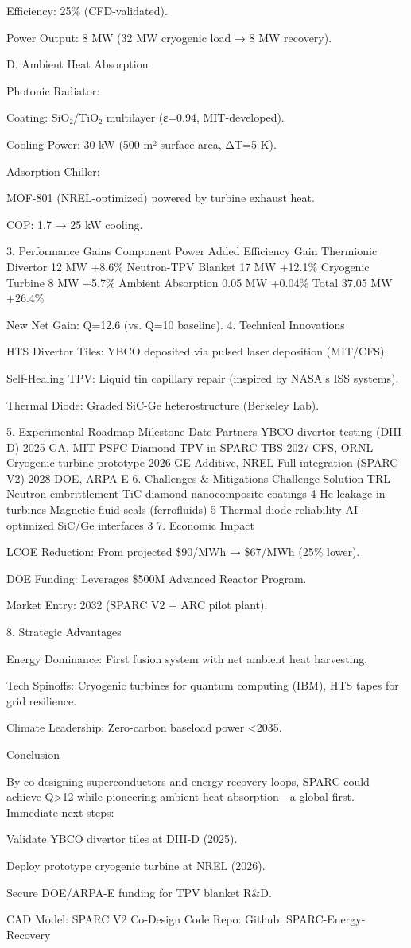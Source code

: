 \documentclass{article}
\begin{document}
Efficiency: 25\% (CFD-validated).

Power Output: 8 MW (32 MW cryogenic load → 8 MW recovery).

D. Ambient Heat Absorption

Photonic Radiator:

Coating: SiO₂/TiO₂ multilayer (ε=0.94, MIT-developed).

Cooling Power: 30 kW (500 m² surface area, ΔT=5 K).

Adsorption Chiller:

MOF-801 (NREL-optimized) powered by turbine exhaust heat.

COP: 1.7 → 25 kW cooling.

3. Performance Gains Component Power Added Efficiency Gain Thermionic
Divertor 12 MW +8.6\% Neutron-TPV Blanket 17 MW +12.1\% Cryogenic
Turbine 8 MW +5.7\% Ambient Absorption 0.05 MW +0.04\% Total 37.05 MW
+26.4\%

New Net Gain: Q=12.6 (vs. Q=10 baseline). 4. Technical Innovations

HTS Divertor Tiles: YBCO deposited via pulsed laser deposition
(MIT/CFS).

Self-Healing TPV: Liquid tin capillary repair (inspired by NASA's ISS
systems).

Thermal Diode: Graded SiC-Ge heterostructure (Berkeley Lab).

5. Experimental Roadmap Milestone Date Partners YBCO divertor testing
(DIII-D) 2025 GA, MIT PSFC Diamond-TPV in SPARC TBS 2027 CFS, ORNL
Cryogenic turbine prototype 2026 GE Additive, NREL Full integration
(SPARC V2) 2028 DOE, ARPA-E 6. Challenges \& Mitigations Challenge
Solution TRL Neutron embrittlement TiC-diamond nanocomposite coatings 4
He leakage in turbines Magnetic fluid seals (ferrofluids) 5 Thermal
diode reliability AI-optimized SiC/Ge interfaces 3 7. Economic Impact

LCOE Reduction: From projected \$90/MWh → \$67/MWh (25\% lower).

DOE Funding: Leverages \$500M Advanced Reactor Program.

Market Entry: 2032 (SPARC V2 + ARC pilot plant).

8. Strategic Advantages

Energy Dominance: First fusion system with net ambient heat harvesting.

Tech Spinoffs: Cryogenic turbines for quantum computing (IBM), HTS tapes
for grid resilience.

Climate Leadership: Zero-carbon baseload power \textless2035.

Conclusion

By co-designing superconductors and energy recovery loops, SPARC could
achieve Q\textgreater12 while pioneering ambient heat absorption---a
global first. Immediate next steps:

Validate YBCO divertor tiles at DIII-D (2025).

Deploy prototype cryogenic turbine at NREL (2026).

Secure DOE/ARPA-E funding for TPV blanket R\&D.

CAD Model: SPARC V2 Co-Design Code Repo: Github: SPARC-Energy-Recovery
\end{document}
